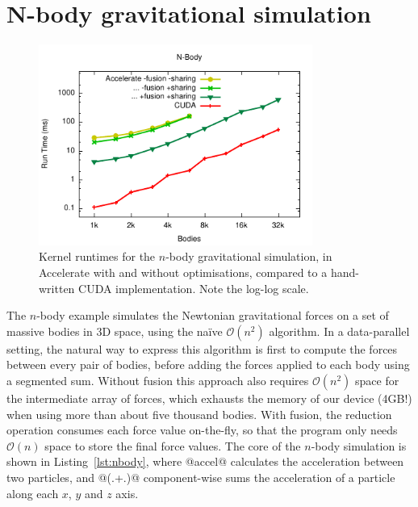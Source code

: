 \section{N-body gravitational simulation}
\label{sec:nbody}

\begin{figure}
    \begin{center}
        \includegraphics[width=0.8\textwidth]{images/sec-6/nbody/nbody}
    \end{center}
    \caption[N-body gravitational simulation kernel benchmarks]{Kernel runtimes
        for the $n$-body gravitational simulation, in Accelerate with and
        without optimisations, compared to a hand-written CUDA implementation.
        Note the log-log scale.}
    \label{fig:nbody}
\end{figure}

The $n$-body example simulates the Newtonian gravitational forces on a set of
massive bodies in 3D space, using the na\"ive $\mathcal{O}\left( n^{2} \right)$
algorithm. In a data-parallel setting, the natural way to express this algorithm
is first to compute the forces between every pair of bodies, before adding the
forces applied to each body using a segmented sum. Without fusion this approach
also requires $\mathcal{O}\left( n^{2} \right)$ space for the intermediate array
of forces, which exhausts the memory of our device (4GB!) when using more than
about five thousand bodies. With fusion, the reduction operation consumes each
force value on-the-fly, so that the program only needs $\mathcal{O}\left( n
\right)$ space to store the final force values. The core of the $n$-body
simulation is shown in Listing~\ref{lst:nbody}, where @accel@ calculates
the acceleration between two particles, and @(.+.)@ component-wise sums the
acceleration of a particle along each $x$, $y$ and $z$ axis.


